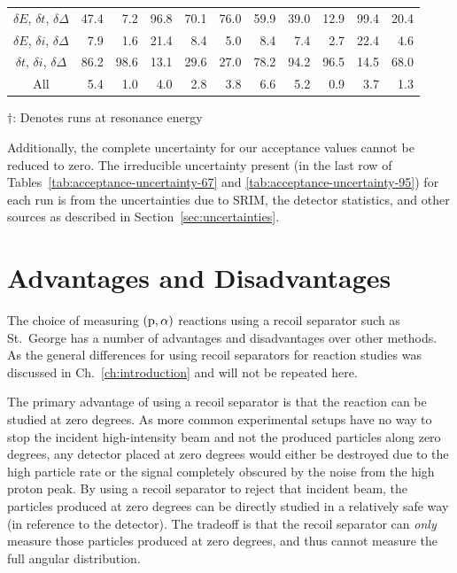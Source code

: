 \begin{table}
\begin{center}
\begin{tabular}{crrrrrrrrrr}
$\delta E$, $\delta t$, $\delta\Delta$ &  47.4 &   7.2 &  96.8 &  70.1 &  76.0 &  59.9 &  39.0 &  12.9 &  99.4 &  20.4 \\
$\delta E$, $\delta i$, $\delta\Delta$ &   7.9 &   1.6 &  21.4 &   8.4 &   5.0 &   8.4 &   7.4 &   2.7 &  22.4 &   4.6 \\
$\delta t$, $\delta i$, $\delta\Delta$ &  86.2 &  98.6 &  13.1 &  29.6 &  27.0 &  78.2 &  94.2 &  96.5 &  14.5 &  68.0 \\
All &   5.4 &   1.0 &   4.0 &   2.8 &   3.8 &   6.6 &   5.2 &   0.9 &   3.7 &   1.3 \\
            \bottomrule
        \end{tabular}

        \vspace{0.5em}
        {\fontsize{10}{12}\selectfont$\dagger$: Denotes runs at
        resonance energy}
    \end{center}
\end{table}

\newpage
Additionally, the complete uncertainty for our acceptance values cannot
be reduced to zero. The irreducible uncertainty present (in the last row
of Tables~\ref{tab:acceptance-uncertainty-67} and
\ref{tab:acceptance-uncertainty-95}) for each run is from the
uncertainties due to SRIM, the detector statistics, and other sources as
described in Section~\ref{sec:uncertainties}.


\section{Advantages and Disadvantages}

The choice of measuring $({\rm p},\alpha)$ reactions using a recoil
separator such as St.\ George has a number of advantages and
disadvantages over other methods. As the general differences for using
recoil separators for reaction studies was discussed in
Ch.~\ref{ch:introduction} and will not be repeated here.

The primary advantage of using a recoil separator is that the reaction
can be studied at zero degrees. As more common experimental setups have
no way to stop the incident high-intensity beam and not the produced
particles along zero degrees, any detector placed at zero degrees would
either be destroyed due to the high particle rate or the signal
completely obscured by the noise from the high proton peak. By using a
recoil separator to reject that incident beam, the particles produced at
zero degrees can be directly studied in a relatively safe way (in
reference to the detector). The tradeoff is that the recoil separator
can \textit{only} measure those particles produced at zero degrees, and
thus cannot measure the full angular distribution.

